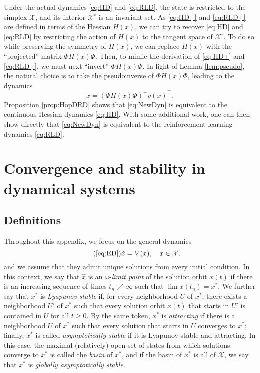 \documentclass[reqno]{amsart}
\theoremstyle{plain}
\theoremstyle{definition}
\theoremstyle{remark}
\numberwithin{equation}{section}
\numberwithin{theorem}{section}
\begin{document}
Under the actual dynamics \eqref{eq:HD} and \eqref{eq:RLD}, the state is restricted to the simplex ${\mathcal{X}}$, and its interior ${{\mathcal{X}}^{\circ}}$ is an invariant set.
As \eqref{eq:HD+} and \eqref{eq:RLD+} are defined in terms of the Hessian ${H}(x)$, we can try to recover \eqref{eq:HD} and \eqref{eq:RLD} by restricting the action of ${H}(x)$ to the tangent space of ${{\mathcal{X}}^{\circ}}$.
To do so while preserving the symmetry of ${H}(x)$, we can replace ${H}(x)$ with the ``projected'' matrix ${\Phi} {H}(x) {\Phi}$.
Then, to mimic the derivation of \eqref{eq:HD+} and \eqref{eq:RLD+}, we must next ``invert'' ${\Phi} {H}(x) {\Phi}$.
In light of Lemma \ref{lem:pseudo}, the natural choice is to take the pseudoinverse of ${\Phi} {H}(x) {\Phi}$, leading to the dynamics 
\begin{equation}
\label{eq:NewDyn}
\dot x
	= ({\Phi} {H}(x) {\Phi})^{+} {v}(x)^{{\!\top}}.
\end{equation}
Proposition \ref{prop:HopDRD} shows that \eqref{eq:NewDyn} is equivalent to the continuous Hessian dynamics \eqref{eq:HD}.
With some additional work, one can then show directly that \eqref{eq:NewDyn} is equivalent to the reinforcement learning dynamics \eqref{eq:RLD}.

\section{Convergence and stability in dynamical systems}
\label{app:dynamics}

\subsection{Definitions}

Throughout this appendix, we focus on the general dynamics
\begin{equation}
\tag{\ref*{eq:ED}}
\dot x
	= {V}(x),
	\quad
	x\in{\mathcal{X}},
\end{equation}
and we assume that they admit unique solutions from every initial condition.
In this context, we say that ${\hat x}$ is an $\omega$-\emph{limit point} of the solution orbit $x(t)$ if there is an increasing sequence of times $t_{n}\nearrow\infty$ such that $\lim x(t_{n}) = {x^{\ast}}$.
We further say that ${x^{\ast}}$ is \emph{Lyapunov stable} if, for every neighborhood $U$ of ${x^{\ast}}$, there exists a neighborhood $U'$ of ${x^{\ast}}$ such that every solution orbit $x(t)$ that starts in $U'$ is contained in $U$ for all $t\geq0$.
By the same token, ${x^{\ast}}$ is \emph{attracting} if there is a neighborhood $U$ of ${x^{\ast}}$ such that every solution that starts
in $U$ converges to ${x^{\ast}}$;
finally, ${x^{\ast}}$ is called \emph{asymptotically stable} if it is Lyapunov stable and attracting.
In this case, the maximal (relatively) open set of states from which solutions converge to ${x^{\ast}}$ is called the \emph{basin} of ${x^{\ast}}$, and if the basin of ${x^{\ast}}$ is all of ${\mathcal{X}}$, we say that ${x^{\ast}}$ is \emph{globally asymptotically stable}.
\end{document}

